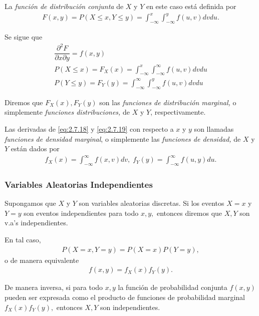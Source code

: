 	La \emph{función de distribución conjunta} de $X$ y $Y$ en este caso está definida por
	\begin{align}
		\label{eq:2.7.16}
	F(x,y)=P(X\leq x, Y\leq y)=
	\int_{-\infty}^{x} \int_{-\infty}^{y} f(u,v)dvdu.
	\end{align}



	Se sigue que
	\begin{align}
	 \dfrac{\partial^{2}F}{\partial x \partial y}=
	 f(x,y)  \label{eq:2.7.17} \\
	  	 P(X\leq x)=F_{X}(x)=\int_{-\infty}^{x}\int_{-\infty}^{\infty} f(u,v)dvdu \label{eq:2.7.18} \\
	 	 P(Y\leq y)=F_{Y}(y)=\int_{-\infty}^{\infty}\int_{-\infty}^{y} f(u,v)dvdu \label{eq:2.7.19}
	\end{align}



 Diremos que $F_{X}(x),F_{Y}(y)$ son las \emph{funciones de distribución marginal,} o simplemente \emph{funciones distribuciones,} de $X$ y $Y$, respectivamente.


 Las derivadas de \eqref{eq:2.7.18} y \eqref{eq:2.7.19} con respecto a $x$ y $y$ son llamadas \emph{funciones de densidad marginal}, o simplemente las \emph{funciones de densidad,} de $X$ y $Y$ están dados por
 \begin{align}
 \label{eq:2.7.20}
 \displaystyle
  f_{X}(x)=\int_{-\infty}^{\infty}f(x,v)dv, \;
  f_{Y}(y)=\int_{-\infty}^{\infty}f(u,y)du.
 \end{align}



 \subsubsection{Variables Aleatorias Independientes}

 Supongamos que $X$ y $Y$ son variables aleatorias discretas.  Si los eventos $X=x$ y $Y=y$ son eventos independientes para todo $x,y,$  entonces diremos que $X,Y$ son v.a's independientes.


 En tal caso,
 \begin{align}
  \label{eq:2.7.21}
  P(X=x,Y=y)=P(X=x)P(Y=y),
 \end{align}
o de manera equivalente
\begin{align}
 f(x,y)=f_{X}(x)f_{Y}(y).
\end{align}



 De manera inversa, si para todo $x,y$ la función de probabilidad conjunta $f(x,y)$ pueden ser expresada como el producto de funciones de probabilidad marginal $f_{X}(x)f_{Y}(y),$ entonces $X,Y$ son independientes.


